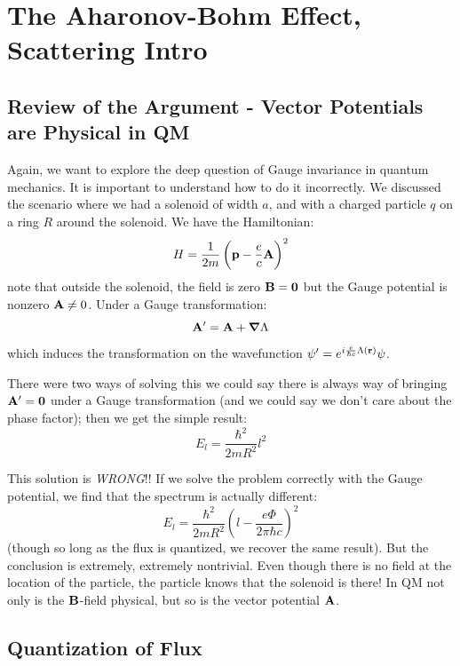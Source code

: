 \section{The Aharonov-Bohm Effect, Scattering Intro}
\subsection{Review of the Argument - Vector Potentials are Physical in QM}
Again, we want to explore the deep question of Gauge invariance in quantum mechanics. It is important to understand how to do it incorrectly. We discussed the scenario where we had a solenoid of width $a$, and with a charged particle $q$ on a ring $R$ around the solenoid. We have the Hamiltonian:
\begin{equation}
    H = \frac{1}{2m}\left(\mathbf{p} - \frac{e}{c}\mathbf{A}\right)^2
\end{equation}
note that outside the solenoid, the field is zero $\mathbf{B} = \mathbf{0}$ but the Gauge potential is nonzero $\mathbf{A} \neq 0$. Under a Gauge transformation:
\begin{equation}
    \v{A}' = \v{A} + \nabla \Lambda
\end{equation}
which induces the transformation on the wavefunction $\psi' = e^{i\frac{e}{\hbar c}\Lambda(\mathbf{r})}\psi$.

There were two ways of solving this we could say there is always way of bringing $\mathbf{A}' = \mathbf{0}$ under a Gauge transformation (and we could say we don't care about the phase factor); then we get the simple result:
\begin{equation}
    E_l = \frac{\hbar^2}{2mR^2}l^2
\end{equation}

This solution is \emph{WRONG}!! If we solve the problem correctly with the Gauge potential, we find that the spectrum is actually different:
\begin{equation}
    E_l = \frac{\hbar^2}{2mR^2}\left(l - \frac{e\Phi}{2\pi\hbar c}\right)^2
\end{equation}
(though so long as the flux is quantized, we recover the same result). But the conclusion is extremely, extremely nontrivial. Even though there is no field at the location of the particle, the particle knows that the solenoid is there! In QM not only is the $\mathbf{B}$-field physical, but so is the vector potential $\mathbf{A}$. 

\subsection{Quantization of Flux}

